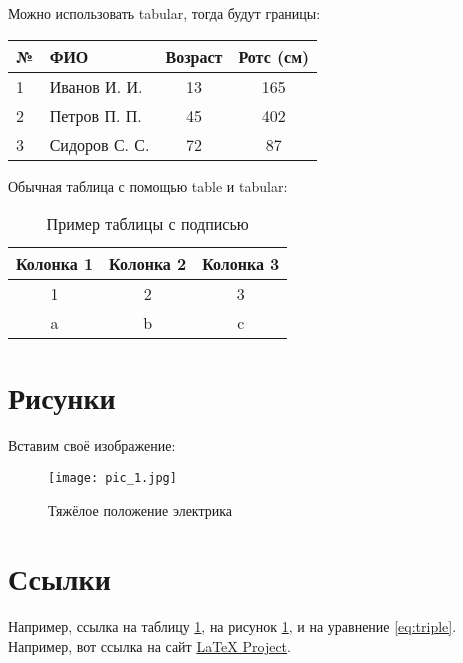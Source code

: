     Можно использовать tabular, тогда будут границы: \\

    \begin{tabular}{l||l||cc}
        \hline
        № & ФИО & Возраст & Ротс (см)\\
        \hline\hline
        1 & Иванов И. И. & 13 & 165 \\
        2 & Петров П. П. & 45 & 402 \\
        3 & Сидоров С. С. & 72 & 87
    \end{tabular}
\newpage
    Обычная таблица с помощью table и tabular:

    \begin{table}[h]
        \centering
        \begin{tabular}{|c|c|c|}
            \hline
            Колонка 1 & Колонка 2 & Колонка 3 \\
            \hline\hline
            1 & 2 & 3 \\
            \hline
            a & b & c \\
            \hline
        \end{tabular}
        \caption{Пример таблицы с подписью}
        \label{tab:example_table}
    \end{table}

\section{Рисунки}
Вставим своё изображение:

\begin{figure}[h]
    \centering
    \texttt{[image: pic\_1.jpg]}
    \caption{Тяжёлое положение электрика}
    \label{fig:pic_1}
\end{figure}

\section*{Ссылки}
    Например, ссылка на таблицу \ref{tab:example_table}, на рисунок \ref{fig:pic_1}, и на уравнение \ref{eq:triple}. Например, вот ссылка на сайт \href{https://www.latex-project.org/}{LaTeX Project}.

